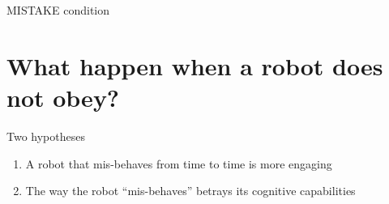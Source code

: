 \documentclass[compress]{beamer}
\renewcommand{\bf}{\Medium}
\begin{document}
\begin{frame}{MISTAKE condition}

    \centering
\end{frame}

\section{What happen when a robot does not obey?}


\begin{frame}{Two hypotheses}
\begin{enumerate}
    \item<1-> {\bf A robot that mis-behaves from time to time is more
        engaging}
    \item<2-> {\bf The way the robot ``mis-behaves'' betrays its cognitive
    capabilities}
\end{enumerate}

\end{frame}

\end{document}
